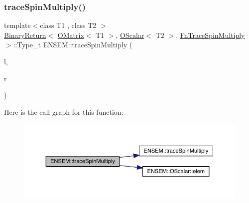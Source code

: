 \subsubsection{\texorpdfstring{traceSpinMultiply()}{traceSpinMultiply()}\hspace{0.1cm}{\footnotesize\ttfamily [2/3]}}
{\footnotesize\ttfamily template$<$class T1 , class T2 $>$ \\
\mbox{\hyperlink{structENSEM_1_1BinaryReturn}{Binary\+Return}}$<$ \mbox{\hyperlink{classENSEM_1_1OMatrix}{O\+Matrix}}$<$ T1 $>$, \mbox{\hyperlink{classENSEM_1_1OScalar}{O\+Scalar}}$<$ T2 $>$, \mbox{\hyperlink{structENSEM_1_1FnTraceSpinMultiply}{Fn\+Trace\+Spin\+Multiply}} $>$\+::Type\+\_\+t E\+N\+S\+E\+M\+::trace\+Spin\+Multiply (\begin{DoxyParamCaption}\item[{const \mbox{\hyperlink{classENSEM_1_1OMatrix}{O\+Matrix}}$<$ T1 $>$ \&}]{l,  }\item[{const \mbox{\hyperlink{classENSEM_1_1OScalar}{O\+Scalar}}$<$ T2 $>$ \&}]{r }\end{DoxyParamCaption})\hspace{0.3cm}{\ttfamily [inline]}}

Here is the call graph for this function\+:\nopagebreak
\begin{figure}[H]
\begin{center}
\leavevmode
\includegraphics[width=350pt]{d8/d55/group__obsmatrix_gaff573e35e3b3904f735317f67cae28f6_cgraph}
\end{center}
\end{figure}
\mbox{\label{group__obsmatrix_gaa152d77bf9e2e211ff35c733b40f6c64}} 

